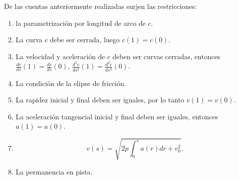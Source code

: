 \documentclass[10pt,mathserif]{beamer}
\begin{document}
\begin{frame}

De las cuentas anteriormente realizadas surjen las restricciones:
\begin{enumerate}
\item la parametrización por longitud de arco de $c$.
\item La curva $c$ debe ser cerrada, luego $c(1)=c(0)$.
\item La velocidad y aceleraci\'on de $c$ deben ser curvas cerradas, entonces $\frac{dc}{ds}(1)=\frac{dc}{ds}(0)$, $\frac{d^2c}{ds^2}(1)=\frac{d^2c}{ds^2}(0)$.

\item La condición de la elipse de fricción.

\item La rapidez inicial y final deben ser iguales, por lo tanto $v(1)=v(0)$.

\item La aceleraci\'on tangencial inicial y final deben ser iguales, entonces $a(1)=a(0)$. 

\item \begin{equation*}
v(s)=\sqrt{2p \int_0^s a(r)dr + v_0^2}.
\end{equation*}

\item La permanencia en pista.
\end{enumerate}

\end{frame}
\end{document}
